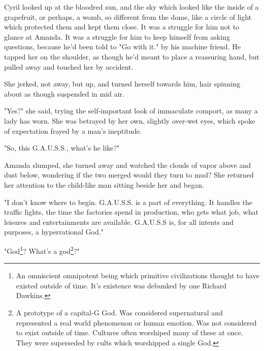 \documentclass[12pt]{article}
\begin{document}
Cyril looked up at the bloodred sun, and the sky which looked like the inside of a grapefruit, or perhaps, a womb, so different from the dome, like a circle of light which protected them and kept them close. It was a struggle for him not to glance at Amanda. It was a struggle for him to keep himself from asking questions, because he'd been told to "Go with it." by his machine friend. He tapped her on the shoulder, as though he'd meant to place a reassuring hand, but pulled away and touched her by accident.

She jerked, not away, but up, and turned herself towards him, hair spinning about as though suspended in mid air.

"Yes?" she said, trying the self-important look of immaculate comport, as many a lady has worn. She was betrayed by her own, slightly over-wet eyes, which spoke of expectation frayed by a man's ineptitude.

"So, this G.A.U.S.S., what's he like?"

Amanda slumped, she turned away and watched the clouds of vapor above and dust below, wondering if the two merged would they turn to mud? She returned her attention to the child-like man sitting beside her and began.

"I don't know where to begin. G.A.U.S.S. is a part of everything. It handles the traffic lights, the time the factories spend in production, who gets what job, what leisures and entertainments are available. G.A.U.S.S is, for all intents and purposes, a hyperrational God."

"God\footnote{An omniscient omnipotent being which primitive civilizations thought to have existed outside of time. It's existence was debunked by one Richard Dawkins.}? What's a god\footnote{A prototype of a capital-G God. Was considered supernatural and represented a real world phenomenon or human emotion. Was not considered to exist outside of time. Cultures often worshiped many of these at once. They were superseded by cults which worshipped a single God.}?"
\end{document}
